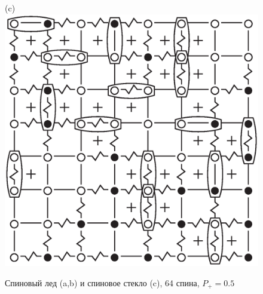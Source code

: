 \documentclass[utf8, babel, sor, jor, amsmath, amssymb, reprint]{elsarticle} %
\begin{document}
\begin{figure}[H]
\begin{minipage}[h]{0.3\linewidth}
	\end{minipage}
	\hfill
	\begin{minipage}[h]{0.3\linewidth}
		\centering(c)
		\includegraphics[width=1\linewidth]{pictures/SG_64_J0}
	\end{minipage}

	\caption{Спиновый лед (a,b) и спиновое стекло (c), 64 спина, $P_+ = 0.5$}
	\label{fig:cell_SI_SG_64}

\end{figure}
\end{document}

